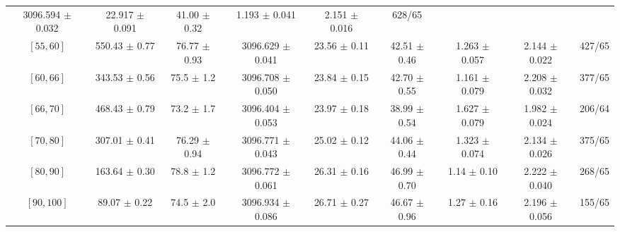 \begin{tabular}{c||c|c|c|c|c|c|c||c}
3096.594 $\pm$ 0.032 & 
22.917 $\pm$ 0.091 & 
41.00 $\pm$ 0.32 & 
1.193 $\pm$ 0.041 & 
2.151 $\pm$ 0.016 & 
628/65\\
$[55, 60]$ & 550.43 $\pm$ 0.77 & 
76.77 $\pm$ 0.93 & 
3096.629 $\pm$ 0.041 & 
23.56 $\pm$ 0.11 & 
42.51 $\pm$ 0.46 & 
1.263 $\pm$ 0.057 & 
2.144 $\pm$ 0.022 & 
427/65\\
$[60, 66]$ & 343.53 $\pm$ 0.56 & 
75.5 $\pm$ 1.2 & 
3096.708 $\pm$ 0.050 & 
23.84 $\pm$ 0.15 & 
42.70 $\pm$ 0.55 & 
1.161 $\pm$ 0.079 & 
2.208 $\pm$ 0.032 & 
377/65\\
$[66, 70]$ & 468.43 $\pm$ 0.79 & 
73.2 $\pm$ 1.7 & 
3096.404 $\pm$ 0.053 & 
23.97 $\pm$ 0.18 & 
38.99 $\pm$ 0.54 & 
1.627 $\pm$ 0.079 & 
1.982 $\pm$ 0.024 & 
206/64\\
$[70, 80]$ & 307.01 $\pm$ 0.41 & 
76.29 $\pm$ 0.94 & 
3096.771 $\pm$ 0.043 & 
25.02 $\pm$ 0.12 & 
44.06 $\pm$ 0.44 & 
1.323 $\pm$ 0.074 & 
2.134 $\pm$ 0.026 & 
375/65\\
$[80, 90]$ & 163.64 $\pm$ 0.30 & 
78.8 $\pm$ 1.2 & 
3096.772 $\pm$ 0.061 & 
26.31 $\pm$ 0.16 & 
46.99 $\pm$ 0.70 & 
1.14 $\pm$ 0.10 & 
2.222 $\pm$ 0.040 & 
268/65\\
$[90, 100]$ & 89.07 $\pm$ 0.22 & 
74.5 $\pm$ 2.0 & 
3096.934 $\pm$ 0.086 & 
26.71 $\pm$ 0.27 & 
46.67 $\pm$ 0.96 & 
1.27 $\pm$ 0.16 & 
2.196 $\pm$ 0.056 & 
155/65\\
\end{tabular}

